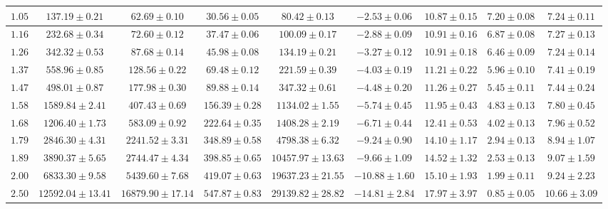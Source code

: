 \begin{sidewaystable}[t!]
\begin{tabular}{|c|c|c|c|c|c|c|c|c|}
            \hline
            $1.05$ & $137.19 \pm 0.21$ & $62.69 \pm 0.10$ & $30.56 \pm 0.05$ & $80.42 \pm 0.13$ & $-2.53 \pm 0.06$ & $10.87 \pm 0.15$ & $7.20 \pm 0.08$ & $7.24 \pm 0.11$ \\
            \hline
            $1.16$ & $232.68 \pm 0.34$ & $72.60 \pm 0.12$ & $37.47 \pm 0.06$ & $100.09 \pm 0.17$ & $-2.88 \pm 0.09$ & $10.91 \pm 0.16$ & $6.87 \pm 0.08$ & $7.27 \pm 0.13$ \\
            \hline
            $1.26$ & $342.32 \pm 0.53$ & $87.68 \pm 0.14$ & $45.98 \pm 0.08$ & $134.19 \pm 0.21$ & $-3.27 \pm 0.12$ & $10.91 \pm 0.18$ & $6.46 \pm 0.09$ & $7.24 \pm 0.14$ \\
            \hline
            $1.37$ & $558.96 \pm 0.85$ & $128.56 \pm 0.22$ & $69.48 \pm 0.12$ & $221.59 \pm 0.39$ & $-4.03 \pm 0.19$ & $11.21 \pm 0.22$ & $5.96 \pm 0.10$ & $7.41 \pm 0.19$ \\
            \hline
            $1.47$ & $498.01 \pm 0.87$ & $177.98 \pm 0.30$ & $89.88 \pm 0.14$ & $347.32 \pm 0.61$ & $-4.48 \pm 0.20$ & $11.26 \pm 0.27$ & $5.45 \pm 0.11$ & $7.44 \pm 0.24$ \\
            \hline
            $1.58$ & $1589.84 \pm 2.41$ & $407.43 \pm 0.69$ & $156.39 \pm 0.28$ & $1134.02 \pm 1.55$ & $-5.74 \pm 0.45$ & $11.95 \pm 0.43$ & $4.83 \pm 0.13$ & $7.80 \pm 0.45$ \\
            \hline
            $1.68$ & $1206.40 \pm 1.73$ & $583.09 \pm 0.92$ & $222.64 \pm 0.35$ & $1408.28 \pm 2.19$ & $-6.71 \pm 0.44$ & $12.41 \pm 0.53$ & $4.02 \pm 0.13$ & $7.96 \pm 0.52$ \\
            \hline
            $1.79$ & $2846.30 \pm 4.31$ & $2241.52 \pm 3.31$ & $348.89 \pm 0.58$ & $4798.38 \pm 6.32$ & $-9.24 \pm 0.90$ & $14.10 \pm 1.17$ & $2.94 \pm 0.13$ & $8.94 \pm 1.07$ \\
            \hline
            $1.89$ & $3890.37 \pm 5.65$ & $2744.47 \pm 4.34$ & $398.85 \pm 0.65$ & $10457.97 \pm 13.63$ & $-9.66 \pm 1.09$ & $14.52 \pm 1.32$ & $2.53 \pm 0.13$ & $9.07 \pm 1.59$ \\
            \hline
            $2.00$ & $6833.30 \pm 9.58$ & $5439.60 \pm 7.68$ & $419.07 \pm 0.63$ & $19637.23 \pm 21.55$ & $-10.88 \pm 1.60$ & $15.10 \pm 1.93$ & $1.99 \pm 0.11$ & $9.24 \pm 2.23$ \\
            \hline
            $2.50$ & $12592.04 \pm 13.41$ & $16879.90 \pm 17.14$ & $547.87 \pm 0.83$ & $29139.82 \pm 28.82$ & $-14.81 \pm 2.84$ & $17.97 \pm 3.97$ & $0.85 \pm 0.05$ & $10.66 \pm 3.09$ \\

\end{tabular}
\end{sidewaystable}
